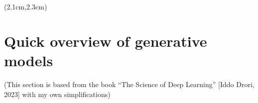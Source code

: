 \begin{preview}

\title{\vspace{-1.5cm} \bfseries\color{blue}{\LARGE AGI = RL + LLM}}

\date{\vspace{-2cm}} %

\maketitle

\setcounter{section}{-1}
\setcounter{mypage}{1}

\begin{textblock*}{5cm}(2.1cm,2.3cm) %
{\color{red}{\large \textcircled{\small \themypage}}}
\addtocounter{mypage}{1}
\end{textblock*}

\begin{minipage}{\textwidth}
\setlength{\parskip}{0.4\baselineskip}

\section{Quick overview of generative models}

(This section is based from the book ``The Science of Deep Learning'' [Iddo Drori, 2023] with my own simplifications)


\end{minipage}
\end{preview}

